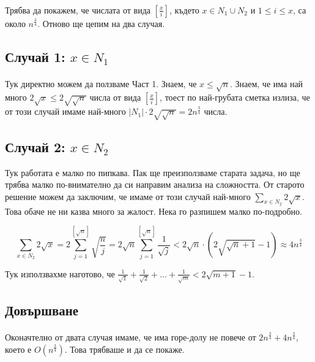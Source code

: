 \documentclass[12pt]{article}
\begin{document}
\paragraph*{}
Трябва да покажем, че числата от вида $[\frac{x}{i}]$, където $x \in N_1 \cup N_2$ и $1 \leq i \leq x$, са около $n^{\frac{3}{4}}$. 
Отново ще цепим на два случая.

\subsection*{Случай 1: $x \in N_1$}
\paragraph*{}
Тук директно можем да ползваме Част 1. Знаем, че $x \leq \sqrt{n}$. Знаем, че има най много $2 \sqrt{x} \leq 2 \sqrt{\sqrt{n}}$ числа от вида $[\frac{x}{i}]$, тоест по най-грубата сметка излиза, че от този случай имаме най-много $|N_1| \cdot 2 \sqrt{\sqrt{n}} = 2 n^{\frac{3}{4}}$ числа.

\subsection*{Случай 2: $x \in N_2$}  
Тук работата е малко по пипкава. Пак ще преизползваме старата задача, но ще трябва малко по-внимателно да си направим анализа на сложността. От старото решение можем да заключим, че имаме от този случай най-много $\displaystyle\sum_{x \in N_2} 2 \sqrt{x}$. Това обаче не ни казва много за жалост. Нека го разпишем малко по-подробно. 

\begin{equation*}
    \displaystyle\sum_{x \in N_2} 2 \sqrt{x} = 2\displaystyle\sum_{j=1}^{[\sqrt{n}]} \sqrt{\frac{n}{j}} = 2 \sqrt{n} \displaystyle\sum_{j=1}^{[\sqrt{n}]} \frac{1}{\sqrt{j}} < 2 \sqrt{n} \cdot (2 \sqrt{\sqrt{n}+1} - 1) \approx 4 n^{\frac{3}{4}}
\end{equation*}

Тук използвахме наготово, че $\frac{1}{\sqrt{1}} + \frac{1}{\sqrt{2}} + ... + \frac{1}{\sqrt{m}} < 2\sqrt{m+1} - 1$.

\subsection*{Довършване}
\paragraph*{}
Оконачтелно от двата случая имаме, че има горе-долу не повече от $2 n^{\frac{3}{4}} + 4 n^{\frac{3}{4}}$, което е $O(n^{\frac{3}{4}})$. Това трябваше и да се покаже.
\end{document}
